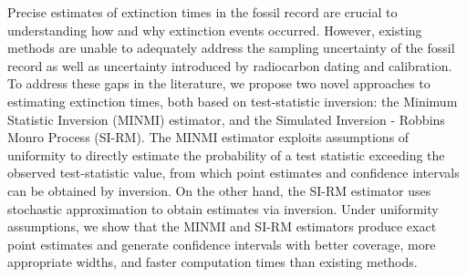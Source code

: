 

Precise estimates of extinction times in the fossil record are crucial to understanding how and why extinction events occurred. However, existing methods are unable to adequately address the sampling uncertainty of the fossil record as well as uncertainty introduced by radiocarbon dating and calibration. To address these gaps in the literature, we propose two novel approaches to estimating extinction times, both based on test-statistic inversion: the Minimum Statistic Inversion (MINMI) estimator, and the Simulated Inversion - Robbins Monro Process (SI-RM). The MINMI estimator exploits assumptions of uniformity to directly estimate the probability of a test statistic exceeding the observed test-statistic value, from which point estimates and confidence intervals can be obtained by inversion. On the other hand, the SI-RM estimator uses stochastic approximation to obtain estimates via inversion. Under uniformity assumptions, we show that the MINMI and SI-RM estimators produce exact point estimates and generate confidence intervals with better coverage, more appropriate widths, and faster computation times than existing methods.